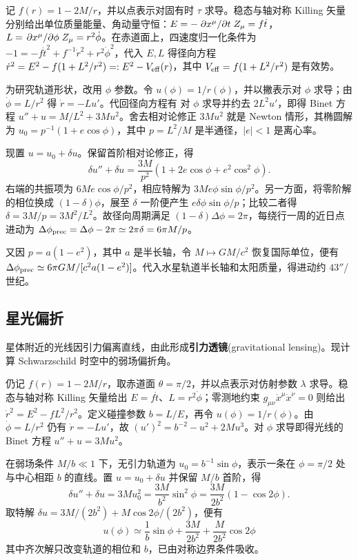 记 $f(r)=1-2M/r$，并以点表示对固有时 $\tau$ 求导。稳态与轴对称 Killing 矢量分别给出单位质量能量、角动量守恒：$E=-\pdv*{x^\mu}{t}Z_\mu=f\dot t$，$L=\pdv*{x^\mu}{\phi}Z_\mu=r^2\dot\phi$。在赤道面上，四速度归一化条件为 $-1=-f\dot t^2+f^{-1}\dot r^2+r^2\dot\phi^2$，代入 $E,L$ 得径向方程 $\dot r^2=E^2-f(1+L^2/r^2)=:E^2-V_{\rm eff}(r)$，其中 $V_{\rm eff}=f(1+L^2/r^2)$ 是有效势。

为研究轨道形状，改用 $\phi$ 参数。令 $u(\phi)=1/r(\phi)$，并以撇表示对 $\phi$ 求导；由 $\dot\phi=L/r^2$ 得 $\dot r=-Lu'$。代回径向方程有
对 $\phi$ 求导并约去 $2L^2u'$，即得 Binet 方程 $u''+u=M/L^2+3Mu^2$。舍去相对论修正 $3Mu^2$ 就是 Newton 情形，其椭圆解为 $u_0=p^{-1}(1+e\cos\phi)$，其中 $p=L^2/M$ 是半通径，$|e|<1$ 是离心率。

现置 $u=u_0+\delta u$。保留首阶相对论修正，得
\[
\delta u''+\delta u=\frac{3M}{p^2}\left(1+2e\cos\phi+e^2\cos^2\phi\right).
\]
右端的共振项为 $6Me\cos\phi/p^2$，相应特解为 $3Me\phi\sin\phi/p^2$。另一方面，将零阶解的相位换成 $(1-\delta)\phi$，展至 $\delta$ 一阶便产生 $e\delta\phi\sin\phi/p$；比较二者得 $\delta=3M/p=3M^2/L^2$。故径向周期满足 $(1-\delta)\Delta\phi=2\pi$，每绕行一周的近日点进动为 $\Delta\phi_{\rm prec}=\Delta\phi-2\pi\simeq2\pi\delta=6\pi M/p$。

又因 $p=a(1-e^2)$，其中 $a$ 是半长轴，令 $M\mapsto GM/c^2$ 恢复国际单位，便有 $\Delta\phi_{\rm prec}\simeq6\pi GM/[c^2a(1-e^2)]$。代入水星轨道半长轴和太阳质量，得进动约 $43''$/世纪。

\subsection{星光偏折}

星体附近的光线因引力偏离直线，由此形成\textbf{引力透镜}(gravitational lensing)。现计算 Schwarzschild 时空中的弱场偏折角。

仍记 $f(r)=1-2M/r$，取赤道面 $\theta=\pi/2$，并以点表示对仿射参数 $\lambda$ 求导。稳态与轴对称 Killing 矢量给出 $E=f\dot t$、$L=r^2\dot\phi$；零测地约束 $g_{\mu\nu}\dot x^\mu\dot x^\nu=0$ 则给出 $\dot r^2=E^2-fL^2/r^2$。定义碰撞参数 $b=L/E$，再令 $u(\phi)=1/r(\phi)$。由 $\dot\phi=L/r^2$ 仍有 $\dot r=-Lu'$，故 $(u')^2=b^{-2}-u^2+2Mu^3$。对 $\phi$ 求导即得光线的 Binet 方程 $u''+u=3Mu^2$。

在弱场条件 $M/b\ll1$ 下，无引力轨道为 $u_0=b^{-1}\sin\phi$，表示一条在 $\phi=\pi/2$ 处与中心相距 $b$ 的直线。置 $u=u_0+\delta u$ 并保留 $M/b$ 首阶，得
\[
\delta u''+\delta u=3M u_0^2=\frac{3M}{b^2}\sin^2\phi=\frac{3M}{2b^2}\left(1-\cos2\phi\right).
\]
取特解 $\delta u=3M/(2b^2)+M\cos2\phi/(2b^2)$，便有
\[
u(\phi)\simeq \frac{1}{b}\sin\phi+\frac{3M}{2b^2}+\frac{M}{2b^2}\cos2\phi
\]
其中齐次解只改变轨道的相位和 $b$，已由对称边界条件吸收。

